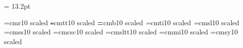 %
\def\selectfonts#1{\csname #1fonts\endcsname \csname\curfontstyle\endcsname}

\def\rm{\fam=0 \setfontstyle{rm}}
\def\it{\fam=\itfam \setfontstyle{it}}
\def\sl{\fam=\slfam \setfontstyle{sl}}
\def\bf{\fam=\bffam \setfontstyle{bf}}\def\bfstylename{bf}
\def\tt{\fam=\ttfam \setfontstyle{tt}}

\newfam\sffam
\def\sf{\fam=\sffam \setfontstyle{sf}}
\let\li = \sf %

\def\ttsl{\setfontstyle{ttsl}}

\newdimen\textleading  \textleading = 13.2pt

%
\def\lineskipfactor{.08333}
\def\strutheightpercent{.70833}
\def\strutdepthpercent {.29167}
%
\def\setleading#1{%
  \normalbaselineskip = #1\relax
  \normallineskip = \lineskipfactor\normalbaselineskip
  \normalbaselines
  \setbox\strutbox =\hbox{%
    \vrule width0pt height\strutheightpercent\baselineskip
                    depth \strutdepthpercent \baselineskip
  }%
}

\def\setfont#1#2#3#4{\font#1=\fontprefix#2#3 scaled #4}

\ifx\fontprefix\undefined
\def\fontprefix{cm}
\fi
\def\rmshape{r}
\def\rmbshape{bx}               %
\def\bfshape{b}
\def\bxshape{bx}
\def\ttshape{tt}
\def\ttbshape{tt}
\def\ttslshape{sltt}
\def\itshape{ti}
\def\itbshape{bxti}
\def\slshape{sl}
\def\slbshape{bxsl}
\def\sfshape{ss}
\def\sfbshape{ss}
\def\scshape{csc}
\def\scbshape{csc}

\def\textnominalsize{11pt}
\edef\mainmagstep{\magstephalf}
\setfont\textrm\rmshape{10}{\mainmagstep}
\setfont\texttt\ttshape{10}{\mainmagstep}
\setfont\textbf\bfshape{10}{\mainmagstep}
\setfont\textit\itshape{10}{\mainmagstep}
\setfont\textsl\slshape{10}{\mainmagstep}
\setfont\textsf\sfshape{10}{\mainmagstep}
\setfont\textsc\scshape{10}{\mainmagstep}
\setfont\textttsl\ttslshape{10}{\mainmagstep}
\font\texti=cmmi10 scaled \mainmagstep
\font\textsy=cmsy10 scaled \mainmagstep

